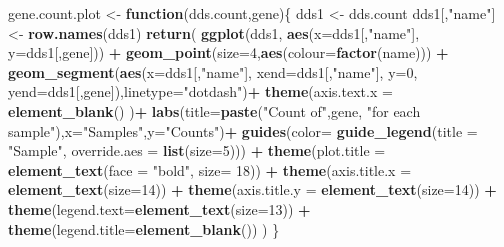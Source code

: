 \documentclass[
  12pt,
]{article}
\newenvironment{Shaded}{\begin{snugshade}}{\end{snugshade}}
\newcommand{\ControlFlowTok}[1]{\textcolor[rgb]{0.13,0.29,0.53}{\textbf{#1}}}
\newcommand{\DataTypeTok}[1]{\textcolor[rgb]{0.13,0.29,0.53}{#1}}
\newcommand{\DecValTok}[1]{\textcolor[rgb]{0.00,0.00,0.81}{#1}}
\newcommand{\KeywordTok}[1]{\textcolor[rgb]{0.13,0.29,0.53}{\textbf{#1}}}
\newcommand{\NormalTok}[1]{#1}
\newcommand{\OperatorTok}[1]{\textcolor[rgb]{0.81,0.36,0.00}{\textbf{#1}}}
\newcommand{\StringTok}[1]{\textcolor[rgb]{0.31,0.60,0.02}{#1}}
\begin{document}
\begin{Shaded}
\begin{Highlighting}[]
\NormalTok{gene.count.plot <-}\StringTok{ }\ControlFlowTok{function}\NormalTok{(dds.count,gene)\{}
\NormalTok{  dds1 <-}\StringTok{ }\NormalTok{dds.count}
\NormalTok{  dds1[,}\StringTok{"name"}\NormalTok{] <-}\StringTok{ }\KeywordTok{row.names}\NormalTok{(dds1)}
  \KeywordTok{return}\NormalTok{(}
    \KeywordTok{ggplot}\NormalTok{(dds1, }\KeywordTok{aes}\NormalTok{(}\DataTypeTok{x=}\NormalTok{dds1[,}\StringTok{"name"}\NormalTok{], }\DataTypeTok{y=}\NormalTok{dds1[,gene])) }\OperatorTok{+}\StringTok{ }
\StringTok{      }\KeywordTok{geom_point}\NormalTok{(}\DataTypeTok{size=}\DecValTok{4}\NormalTok{,}\KeywordTok{aes}\NormalTok{(}\DataTypeTok{colour=}\KeywordTok{factor}\NormalTok{(name))) }\OperatorTok{+}\StringTok{ }
\StringTok{      }\KeywordTok{geom_segment}\NormalTok{(}\KeywordTok{aes}\NormalTok{(}\DataTypeTok{x=}\NormalTok{dds1[,}\StringTok{"name"}\NormalTok{], }\DataTypeTok{xend=}\NormalTok{dds1[,}\StringTok{"name"}\NormalTok{], }\DataTypeTok{y=}\DecValTok{0}\NormalTok{, }\DataTypeTok{yend=}\NormalTok{dds1[,gene]),}\DataTypeTok{linetype=}\StringTok{"dotdash"}\NormalTok{)}\OperatorTok{+}\StringTok{ }
\StringTok{      }\KeywordTok{theme}\NormalTok{(}\DataTypeTok{axis.text.x =} \KeywordTok{element_blank}\NormalTok{() )}\OperatorTok{+}\StringTok{ }
\StringTok{      }\KeywordTok{labs}\NormalTok{(}\DataTypeTok{title=}\KeywordTok{paste}\NormalTok{(}\StringTok{"Count of"}\NormalTok{,gene,  }\StringTok{"for each sample"}\NormalTok{),}\DataTypeTok{x=}\StringTok{"Samples"}\NormalTok{,}\DataTypeTok{y=}\StringTok{"Counts"}\NormalTok{)}\OperatorTok{+}\StringTok{ }
\StringTok{      }\KeywordTok{guides}\NormalTok{(}\DataTypeTok{color=} \KeywordTok{guide_legend}\NormalTok{(}\DataTypeTok{title =} \StringTok{"Sample"}\NormalTok{, }\DataTypeTok{override.aes =} \KeywordTok{list}\NormalTok{(}\DataTypeTok{size=}\DecValTok{5}\NormalTok{))) }\OperatorTok{+}
\StringTok{      }\KeywordTok{theme}\NormalTok{(}\DataTypeTok{plot.title =} \KeywordTok{element_text}\NormalTok{(}\DataTypeTok{face =} \StringTok{"bold"}\NormalTok{, }\DataTypeTok{size=} \DecValTok{18}\NormalTok{)) }\OperatorTok{+}
\StringTok{      }\KeywordTok{theme}\NormalTok{(}\DataTypeTok{axis.title.x =} \KeywordTok{element_text}\NormalTok{(}\DataTypeTok{size=}\DecValTok{14}\NormalTok{)) }\OperatorTok{+}
\StringTok{      }\KeywordTok{theme}\NormalTok{(}\DataTypeTok{axis.title.y =} \KeywordTok{element_text}\NormalTok{(}\DataTypeTok{size=}\DecValTok{14}\NormalTok{)) }\OperatorTok{+}
\StringTok{      }\KeywordTok{theme}\NormalTok{(}\DataTypeTok{legend.text=}\KeywordTok{element_text}\NormalTok{(}\DataTypeTok{size=}\DecValTok{13}\NormalTok{)) }\OperatorTok{+}
\StringTok{      }\KeywordTok{theme}\NormalTok{(}\DataTypeTok{legend.title=}\KeywordTok{element_blank}\NormalTok{())}
\NormalTok{  )}
\NormalTok{\}}



\end{Highlighting}
\end{Shaded}
\end{document}
